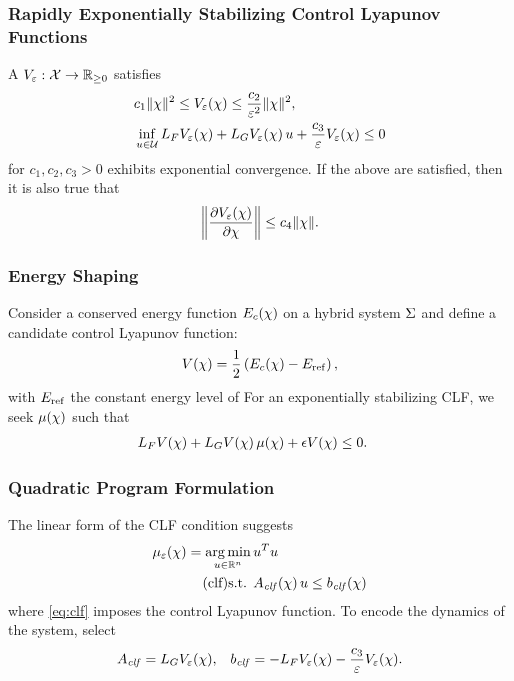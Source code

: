 \begin{frame}[t]
  \frametitle{Rapidly Exponentially Stabilizing Control Lyapunov Functions}
  A 
  $V_{\varepsilon} : \mathcal{X} \to \mathbb{R}_{\geq 0}$ satisfies
  \begin{align*}
    &c_{1} \|\chi\|^{2} \leq V_{\varepsilon}(\chi) \leq \frac{c_{2}}{\varepsilon^{2}} \|\chi\|^{2},\\
    &\inf_{u \in \mathcal{U}} L_{F}V_{\varepsilon}(\chi) + L_{G}V_{\varepsilon}(\chi) \, u +
    \frac{c_{3}}{\varepsilon} V_{\varepsilon}(\chi) \leq 0
  \end{align*}
  for $c_{1}, c_{2}, c_{3} > 0$ exhibits exponential convergence. If the above
  are satisfied, then it is also true that
  \begin{align*}
    \left\| \frac{\partial{V_{\varepsilon}(\chi)}}{\partial{\chi}} \right\| \leq c_{4} \|\chi\|.
  \end{align*}
\end{frame}

\begin{frame}[t]
  \frametitle{Energy Shaping}
  Consider a conserved energy function $E_{c}(\chi)$ on a hybrid system $\Sigma$ and define a candidate
  control Lyapunov function:
  \begin{align*}
    V(\chi) = \frac{1}{2} \left(E_{c}(\chi) - E_{\mathrm{ref}}\right),
  \end{align*}
  with $E_{\mathrm{ref}}$ the constant energy level of 
  For an exponentially stabilizing CLF, we seek $\mu(\chi)$ such that
  \begin{align*}
    L_{F} V(\chi) + L_{G} V(\chi) \, \mu(\chi) + \epsilon V(\chi) &\leq 0.
  \end{align*}
\end{frame}

\begin{frame}[t]
  \frametitle{Quadratic Program Formulation}
  The linear form of the CLF condition suggests
  \begin{align}
    \nonumber
    \mueps\arx = \argmin_{\uu \in \R^{n}}  \, & \uu^T \uu\\
    \label{eq:clf} \tag{clf}
    \mbox{s.t. } & \Aclf\arx \, \uu \leq \bclf\arx%
  \end{align}
  where \eqref{eq:clf} imposes the control Lyapunov function. To encode the dynamics of the system, select
  \begin{align*}
    A_{\mathit{clf}} = L_{G}V_{\varepsilon}(\chi), && b_{\mathit{clf}} = -L_{F}V_{\varepsilon}(\chi) - \frac{c_{3}}{\varepsilon} V_{\varepsilon}(\chi).
  \end{align*}
\end{frame}

